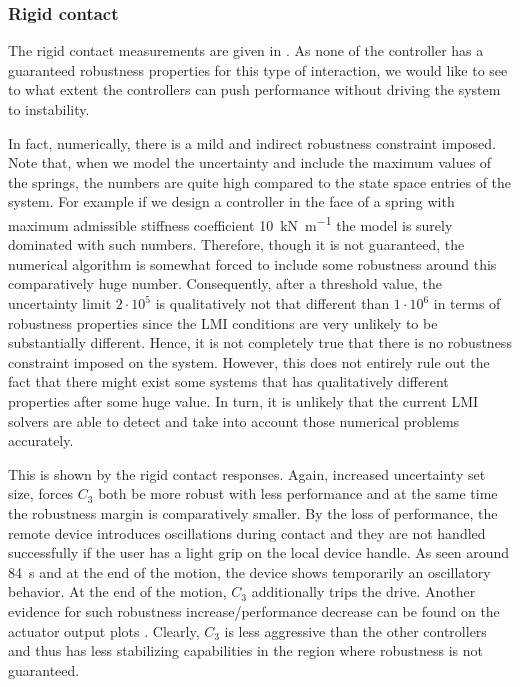\subsubsection{Rigid contact}

The rigid contact measurements are given in . As none 
of the controller has a guaranteed robustness properties for this type of interaction, we would like to see to what extent the
controllers can push performance without driving the system to instability. 

In fact, numerically, there is a mild and indirect robustness constraint imposed. Note that, when we model the uncertainty and 
include the maximum values of the springs, the numbers are quite high compared to the state space entries of the system. For example
if we design a controller in the face of a spring with maximum admissible stiffness coefficient \SI{10}{\kilo\newton\per\meter} the
model is surely dominated with such numbers. Therefore, though it is not guaranteed, the numerical algorithm is somewhat forced to 
include some robustness around this comparatively huge number. Consequently, after a threshold value, the uncertainty limit 
$2\cdot 10^5$ is qualitatively not that different than $1\cdot 10^6$ in terms of robustness properties since the LMI conditions
are very unlikely to be substantially different. Hence, it is not completely true that there is no robustness constraint imposed 
on the system. However, this does not entirely rule out the fact that there might exist some systems that has qualitatively 
different properties after some huge value. In turn, it is unlikely that the current LMI solvers are able to detect and take into 
account those numerical problems accurately. 

This is shown by the rigid contact responses. Again, increased uncertainty set size, forces $C_3$ both be more robust with less 
performance and at the same time the robustness margin is comparatively smaller. By the loss of performance, the remote device introduces 
oscillations during contact and they are not handled successfully if the user has a light grip on the local device handle. As seen around 
\SI{84}{\second} and at the end of the motion, the device shows temporarily an oscillatory behavior. At the end of the motion, $C_3$ 
additionally trips the drive. Another evidence for such robustness increase/performance decrease can be found on the actuator output 
plots . Clearly, $C_3$ is less aggressive than the 
other controllers and thus has less stabilizing capabilities in the region where robustness is not guaranteed. 

